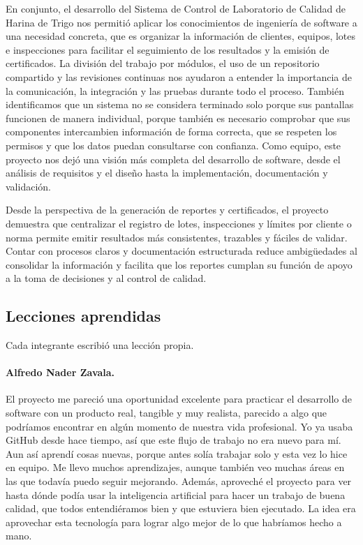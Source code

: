 En conjunto, el desarrollo del Sistema de Control de Laboratorio de Calidad de Harina de Trigo nos permitió aplicar los conocimientos de ingeniería de software a una necesidad concreta, que es organizar la información de clientes, equipos, lotes e inspecciones para facilitar el seguimiento de los resultados y la emisión de certificados. La división del trabajo por módulos, el uso de un repositorio compartido y las revisiones continuas nos ayudaron a entender la importancia de la comunicación, la integración y las pruebas durante todo el proceso. También identificamos que un sistema no se considera terminado solo porque sus pantallas funcionen de manera individual, porque también es necesario comprobar que sus componentes intercambien información de forma correcta, que se respeten los permisos y que los datos puedan consultarse con confianza. Como equipo, este proyecto nos dejó una visión más completa del desarrollo de software, desde el análisis de requisitos y el diseño hasta la implementación, documentación y validación.

Desde la perspectiva de la generación de reportes y certificados, el proyecto demuestra que centralizar el registro de lotes, inspecciones y límites por cliente o norma permite emitir resultados más consistentes, trazables y fáciles de validar. Contar con procesos claros y documentación estructurada reduce ambigüedades al consolidar la información y facilita que los reportes cumplan su función de apoyo a la toma de decisiones y al control de calidad.

\subsection{Lecciones aprendidas}\label{sec:lecciones}

Cada integrante escribió una lección propia.

\paragraph{Alfredo Nader Zavala.} El proyecto me pareció una oportunidad excelente para practicar el desarrollo de software con un producto real, tangible y muy realista, parecido a algo que podríamos encontrar en algún momento de nuestra vida profesional. Yo ya usaba GitHub desde hace tiempo, así que este flujo de trabajo no era nuevo para mí. Aun así aprendí cosas nuevas, porque antes solía trabajar solo y esta vez lo hice en equipo. Me llevo muchos aprendizajes, aunque también veo muchas áreas en las que todavía puedo seguir mejorando. Además, aproveché el proyecto para ver hasta dónde podía usar la inteligencia artificial para hacer un trabajo de buena calidad, que todos entendiéramos bien y que estuviera bien ejecutado. La idea era aprovechar esta tecnología para lograr algo mejor de lo que habríamos hecho a mano.

